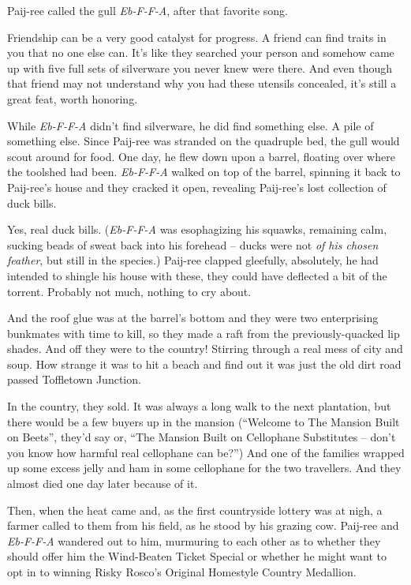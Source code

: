 \documentclass[10pt,twoside]{report}
\begin{document}
Paij-ree called the gull {\em Eb-F-F-A}, after that favorite song.

Friendship can be a very good catalyst for progress.  A friend can
find traits in you that no one else can.  It's like they searched your
person and somehow came up with five full sets of silverware you never
knew were there.  And even though that friend may not understand why
you had these utensils concealed, it's still a great feat, worth
honoring.

While {\em Eb-F-F-A} didn't find silverware, he did find something
else.  A pile of something else.  Since Paij-ree was stranded on the
quadruple bed, the gull would scout around for food.  One day, he flew
down upon a barrel, floating over where the toolshed had been.  {\em
  Eb-F-F-A} walked on top of the barrel, spinning it back to
Paij-ree's house and they cracked it open, revealing Paij-ree's lost
collection of duck bills.

Yes, real duck bills. ({\em Eb-F-F-A} was esophagizing his squawks,
remaining calm, sucking beads of sweat back into his forehead -- ducks
were not {\em of his chosen feather}, but still in the species.)
Paij-ree clapped gleefully, absolutely, he had intended to shingle his
house with these, they could have deflected a bit of the
torrent. Probably not much, nothing to cry about.

And the roof glue was at the barrel's bottom and they were two
enterprising bunkmates with time to kill, so they made a raft from the
previously-quacked lip shades.  And off they were to the country!
Stirring through a real mess of city and soup.  How strange it was to
hit a beach and find out it was just the old dirt road passed
Toffletown Junction.

In the country, they sold.  It was always a long walk to the next
plantation, but there would be a few buyers up in the mansion
(``Welcome to The Mansion Built on Beets'', they'd say or, ``The
Mansion Built on Cellophane Substitutes -- don't you know how harmful
real cellophane can be?'')  And one of the families wrapped up some
excess jelly and ham in some cellophane for the two travellers.  And
they almost died one day later because of it.

Then, when the heat came and, as the first countryside lottery was at
nigh, a farmer called to them from his field, as he stood by his
grazing cow. Paij-ree and {\em Eb-F-F-A} wandered out to him,
murmuring to each other as to whether they should offer him the
Wind-Beaten Ticket Special or whether he might want to opt in to
winning Risky Rosco's Original Homestyle Country Medallion.
\end{document}
